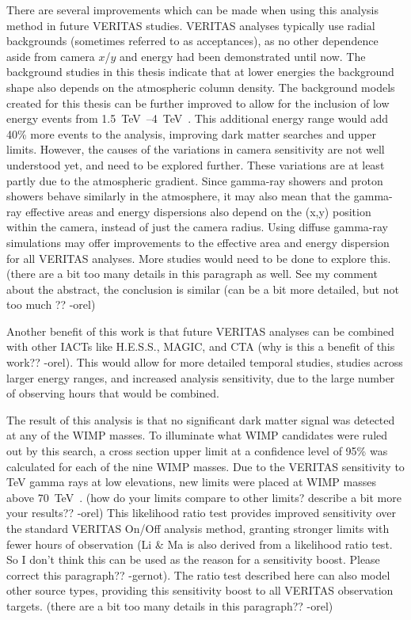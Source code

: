 There are several improvements which can be made when using this analysis method in future VERITAS studies.
VERITAS analyses typically use radial backgrounds (sometimes referred to as acceptances), as no other dependence aside from camera $x$/$y$ and energy had been demonstrated until now.
The background studies in this thesis indicate that at lower energies the background shape also depends on the atmospheric column density.
The background models created for this thesis can be further improved to allow for the inclusion of low energy events from \SIrange{1.5}{4}{\TeV{}}.
This additional energy range would add \nicetilde{}40\% more events to the analysis, improving dark matter searches and upper limits.
However, the causes of the variations in camera sensitivity are not well understood yet, and need to be explored further.
These variations are at least partly due to the atmospheric gradient.
Since gamma-ray showers and proton showers behave similarly in the atmosphere, it may also mean that the gamma-ray effective areas and energy dispersions also depend on the (x,y) position within the camera, instead of just the camera radius.
Using diffuse gamma-ray simulations may offer improvements to the effective area and energy dispersion for all VERITAS analyses.
More studies would need to be done to explore this.
{\color{red}(there are a bit too many details in this paragraph as well.  See my comment about the abstract, the conclusion is similar (can be a bit more detailed, but not too much ?? -orel)}

Another benefit of this work is that future VERITAS analyses can be combined with other IACTs like H.E.S.S., MAGIC, and CTA {\color{red}(why is this a benefit of this work?? -orel)}.
This would allow for more detailed temporal studies, studies across larger energy ranges, and increased analysis sensitivity, due to the large number of observing hours that would be combined.

The result of this analysis is that no significant dark matter signal was detected at any of the WIMP masses.
To illuminate what WIMP candidates were ruled out by this search, a cross section upper limit at a confidence level of 95\% was calculated for each of the nine WIMP masses.
Due to the VERITAS sensitivity to TeV gamma rays at low elevations, new limits were placed at WIMP masses above \SI{70}{\TeV{}}.
{\color{red}(how do your limits compare to other limits? describe a bit more your results?? -orel)}
This likelihood ratio test provides improved sensitivity over the standard VERITAS On/Off analysis method, granting stronger limits with fewer hours of observation {\color{red}(Li & Ma is also derived from a likelihood ratio test. So I don’t think this can be used as the reason for a sensitivity boost. Please correct this paragraph?? -gernot)}.
The ratio test described here can also model other source types, providing this sensitivity boost to all VERITAS observation targets.
{\color{red}(there are a bit too many details in this paragraph?? -orel)}


